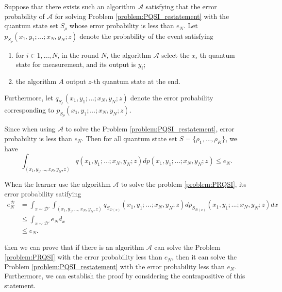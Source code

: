 Suppose that there exists such an algorithm $\mathcal{A}$ satisfying that the error probability of $\mathcal{A}$ for solving Problem \ref{problem:PQSI_restatement} with the quantum state set $S_{\rho}$ whose error probability is less than $e_N$. Let $p_{S_\rho}(x_1,y_1;...;x_N,y_N;z)$ denote the probability of the event satisfying
\begin{enumerate}
    \item for $i \in {1,...,N}$, in the round $N$, the algorithm $\mathcal{A}$ select the $x_i$-th quantum state for measurement, and its output is $y_i$;
    \item the algorithm $A$ output $z$-th quantum state at the end. 
\end{enumerate}
Furthermore, let $q_{S_\rho}(x_1,y_1;...;x_N,y_N;z)$ denote the error probability corresponding to $p_{S_\rho}(x_1,y_1;...;x_N,y_N;z)$.

Since when using $\mathcal{A}$ to solve the Problem \ref{problem:PQSI_restatement}, error probability is less than $e_N$. Then for all quantum state set $S =\{\rho_1,...,\rho_K\}$, we have
\begin{equation}
    \int_{(x_1,y_1,...,x_N,y_N,z)} q(x_1,y_1;...;x_N,y_N;z) dp(x_1,y_1;...;x_N,y_N;z) \leq e_N.
\end{equation}

When the learner use the algorithm $\mathcal{A}$ to solve the problem \ref{problem:PRQSI}, its error probability satifying
\begin{equation}
    \begin{aligned}
        e^\mathcal{D}_{N} & = \int_{x \sim \mathcal{D'}} \int_{(x_1,y_1,...,x_N,y_N,z)} q_{S_{\mathcal{D}(x)}}(x_1,y_1;...;x_N,y_N;z) dp_{S_{\mathcal{D}(x)}}(x_1,y_1;...;x_N,y_N;z) dx\\
        & \leq \int_{x \sim \mathcal{D}'} e_N d_x \\
        & \leq e_N.
    \end{aligned}
\end{equation}

then we can prove that if there is an algorithm $\mathcal{A}$ can solve the Problem \ref{problem:PRQSI} with the error probability less than $e_N$, then it can solve the Problem \ref{problem:PQSI_restatement} with the error probability less than $e_N$. Furthermore, we can establish the proof by considering the contrapositive of this statement. 





